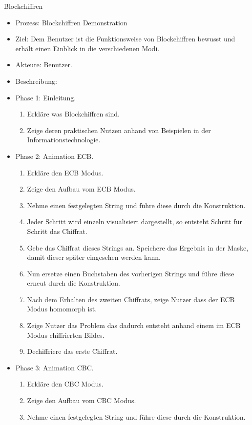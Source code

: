 \documentclass{article}
\begin{document}
\begin{FA}[start=700]
\item Blockchiffren
\end{FA}
\begin{itemize}[label={}]
\item Prozess: Blockchiffren Demonstration
\item Ziel: Dem Benutzer ist die Funktionsweise von Blockchiffren bewusst und erhält einen Einblick in die verschiedenen Modi.
\item Akteure: Benutzer.
\item Beschreibung:
\item Phase 1: Einleitung.
\begin{enumerate}
\item Erkläre was Blockchiffren sind.
\item Zeige deren praktischen Nutzen anhand von Beispielen in der Informationstechnologie.
\end{enumerate}
\item Phase 2: Animation ECB.
\begin{enumerate}
\item Erkläre den ECB Modus.
\item Zeige den Aufbau vom ECB Modus.
\item Nehme einen festgelegten String und führe diese durch die Konstruktion.
\item Jeder Schritt wird einzeln visualisiert dargestellt, so entsteht Schritt für Schritt das Chiffrat.
\item Gebe das Chiffrat dieses Strings an. Speichere das Ergebnis in der Maske, damit dieser später eingesehen werden kann.
\item Nun ersetze einen Buchstaben des vorherigen Strings und führe diese erneut durch die Konstruktion.
\item Nach dem Erhalten des zweiten Chiffrats, zeige Nutzer dass der ECB Modus homomorph ist.
\item Zeige Nutzer das Problem das dadurch entsteht anhand einem im ECB Modus chiffrierten Bildes.
\item Dechiffriere das erste Chiffrat.
\end{enumerate}
\item Phase 3: Animation CBC.
\begin{enumerate}
\item Erkläre den CBC Modus.
\item Zeige den Aufbau vom CBC Modus.
\item Nehme einen festgelegten String und führe diese durch die Konstruktion.

\end{enumerate}
\end{itemize}
\end{document}
